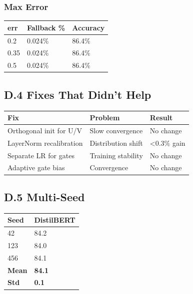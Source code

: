 \subsubsection{Max Error}

\begin{table}[H]
\centering
\small
\begin{tabular}{lll}
\toprule
\textbf{err} & \textbf{Fallback \%} & \textbf{Accuracy} \\
\midrule
0.2 & 0.024\% & 86.4\% \\
0.35 & 0.024\% & 86.4\% \\
0.5 & 0.024\% & 86.4\% \\
\bottomrule
\end{tabular}
\end{table}

\subsection{D.4 Fixes That Didn't Help}

\begin{table}[H]
\centering
\small
\begin{tabular}{lll}
\toprule
\textbf{Fix} & \textbf{Problem} & \textbf{Result} \\
\midrule
Orthogonal init for U/V & Slow convergence & No change \\
LayerNorm recalibration & Distribution shift & \textless{}0.3\% gain \\
Separate LR for gates & Training stability & No change \\
Adaptive gate bias & Convergence & No change \\
\bottomrule
\end{tabular}
\end{table}

\subsection{D.5 Multi-Seed}

\begin{table}[H]
\centering
\small
\begin{tabular}{ll}
\toprule
\textbf{Seed} & \textbf{DistilBERT} \\
\midrule
42 & 84.2 \\
123 & 84.0 \\
456 & 84.1 \\
\textbf{Mean} & \textbf{84.1} \\
\textbf{Std} & \textbf{0.1} \\
\bottomrule
\end{tabular}
\end{table}


